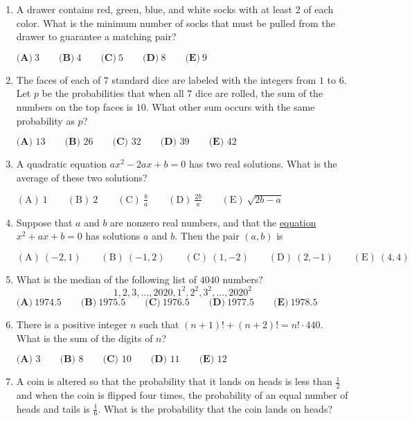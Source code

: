\documentclass{article}%
\begin{document}
\begin{enumerate}
%
\item%
A drawer contains red, green, blue, and white socks with at least 2 of each color. What is
the minimum number of socks that must be pulled from the drawer to guarantee a matching
pair?

$\textbf{(A)}\ 3 \qquad \textbf{(B)}\ 4 \qquad \textbf{(C)}\ 5 \qquad \textbf{(D)}\ 8 \qquad \textbf{(E)}\ 9$

%
\item%
The faces of each of $7$ standard dice are labeled with the integers from $1$ to $6$. Let $p$ be the probabilities that when all $7$ dice are rolled, the sum of the numbers on the top faces is $10$. What other sum occurs with the same probability as $p$?

$\textbf{(A)} \text{ 13} \qquad \textbf{(B)} \text{ 26} \qquad \textbf{(C)} \text{ 32} \qquad \textbf{(D)} \text{ 39} \qquad \textbf{(E)} \text{ 42}$

%
\item%
A quadratic equation $ax^2 - 2ax + b = 0$ has two real solutions. What is the average of these two solutions?

$\mathrm{(A)}\ 1\qquad\mathrm{(B)}\ 2\qquad\mathrm{(C)}\ \frac ba\qquad\mathrm{(D)}\ \frac{2b}a\qquad\mathrm{(E)}\ \sqrt{2b-a}$

%
\item%
Suppose that $a$ and $b$ are nonzero real numbers, and that the \href{/wiki/index.php/Equation}{equation} $x^2 + ax + b = 0$ has solutions $a$ and $b$. Then the pair $(a,b)$ is

$\mathrm{(A)}\ (-2,1) \qquad\mathrm{(B)}\ (-1,2) \qquad\mathrm{(C)}\ (1,-2) \qquad\mathrm{(D)}\ (2,-1) \qquad\mathrm{(E)}\ (4,4)$

%
\item%
What is the median of the following list of $4040$ numbers$?$
\[1, 2, 3, \ldots, 2020, 1^2, 2^2, 3^2, \ldots, 2020^2\]
$\textbf{(A)}\ 1974.5\qquad\textbf{(B)}\ 1975.5\qquad\textbf{(C)}\ 1976.5\qquad\textbf{(D)}\ 1977.5\qquad\textbf{(E)}\ 1978.5$

%
\item%
There is a positive integer $n$ such that $(n+1)! + (n+2)! = n! \cdot 440$. What is the sum of the digits of $n$?

$\textbf{(A) }3\qquad\textbf{(B) }8\qquad\textbf{(C) }10\qquad\textbf{(D) }11\qquad\textbf{(E) }12$

%
\item%
A coin is altered so that the probability that it lands on heads is less than $\frac{1}{2}$ and when the coin is flipped four times, the probability of an equal number of heads and tails is $\frac{1}{6}$. What is the probability that the coin lands on heads?


\end{enumerate}
\end{document}
